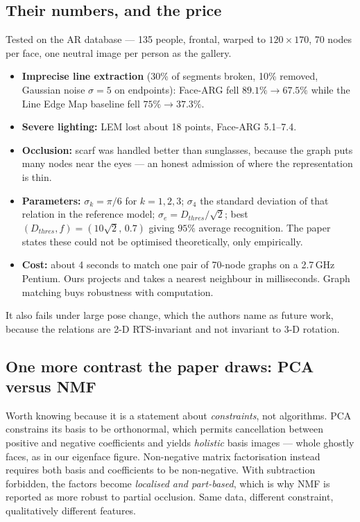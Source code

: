 \documentclass[11pt]{article}
\begin{document}
\subsection{Their numbers, and the price}
Tested on the AR database --- 135 people, frontal, warped to $120\times170$,
70 nodes per face, one neutral image per person as the gallery.
\begin{itemize}
\item \textbf{Imprecise line extraction} (30\% of segments broken, 10\%
  removed, Gaussian noise $\sigma=5$ on endpoints): Face-ARG fell
  $89.1\%\to67.5\%$ while the Line Edge Map baseline fell $75\%\to37.3\%$.
\item \textbf{Severe lighting:} LEM lost about 18 points, Face-ARG 5.1--7.4.
\item \textbf{Occlusion:} scarf was handled better than sunglasses, because the
  graph puts many nodes near the eyes --- an honest admission of where the
  representation is thin.
\item \textbf{Parameters:} $\sigma_k=\pi/6$ for $k=1,2,3$; $\sigma_4$ the
  standard deviation of that relation in the reference model;
  $\sigma_e=D_{thres}/\sqrt2$; best $(D_{thres},f)=(10\sqrt2,\,0.7)$ giving
  $95\%$ average recognition. The paper states these could not be optimised
  theoretically, only empirically.
\item \textbf{Cost:} about 4 seconds to match one pair of 70-node graphs on a
  2.7\,GHz Pentium. Ours projects and takes a nearest neighbour in
  milliseconds. Graph matching buys robustness with computation.
\end{itemize}
It also fails under large pose change, which the authors name as future work,
because the relations are 2-D RTS-invariant and not invariant to 3-D rotation.

\subsection{One more contrast the paper draws: PCA versus NMF}
Worth knowing because it is a statement about \emph{constraints}, not
algorithms. PCA constrains its basis to be orthonormal, which permits
cancellation between positive and negative coefficients and yields
\emph{holistic} basis images --- whole ghostly faces, as in our eigenface
figure. Non-negative matrix factorisation instead requires both basis and
coefficients to be non-negative. With subtraction forbidden, the factors become
\emph{localised and part-based}, which is why NMF is reported as more robust to
partial occlusion. Same data, different constraint, qualitatively different
features.
\end{document}

